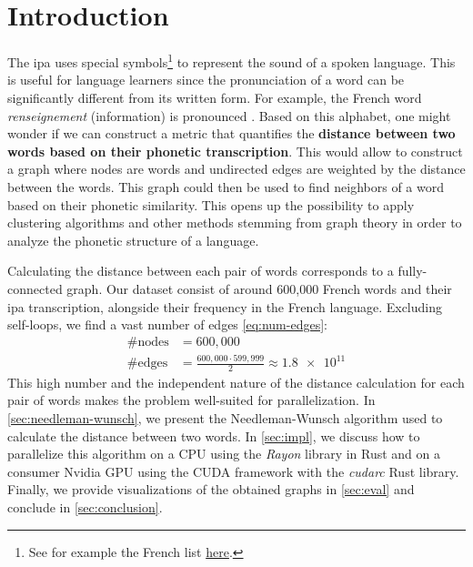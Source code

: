 \section{Introduction}

The \gls{ipa} uses special symbols\footnote{See for example the French list \href{https://en.wikipedia.org/wiki/Help:IPA/French}{here}.} to represent the sound of a spoken language. This is useful for language learners since the pronunciation of a word can be significantly different from its written form. For example, the French word \textit{renseignement} (information) is pronounced . Based on this alphabet, one might wonder if we can construct a metric that quantifies the \textbf{distance between two words based on their phonetic transcription}. This would allow to construct a graph where nodes are words and undirected edges are weighted by the distance between the words. This graph could then be used to find neighbors of a word based on their phonetic similarity. This opens up the possibility to apply clustering algorithms and other methods stemming from graph theory in order to analyze the phonetic structure of a language.

Calculating the distance between each pair of words corresponds to a fully-connected graph. Our dataset consist of around 600,000 French words and their \gls{ipa} transcription, alongside their frequency in the French language. Excluding self-loops, we find a vast number of edges \eqref{eq:num-edges}:
\begin{align}
    \text{\#nodes} &= 600,000 \\
    \text{\#edges} &= \frac{600,000 \cdot 599,999}{2} \approx \num{1.8e11}
\end{align}
This high number and the independent nature of the distance calculation for each pair of words makes the problem well-suited for parallelization. In \autoref{sec:needleman-wunsch}, we present the Needleman-Wunsch algorithm used to calculate the distance between two words. In \autoref{sec:impl}, we discuss how to parallelize this algorithm on a CPU using the \textit{Rayon} library in Rust and on a consumer Nvidia GPU using the CUDA framework with the \textit{cudarc} Rust library. Finally, we provide visualizations of the obtained graphs in \ref{sec:eval} and conclude in \autoref{sec:conclusion}.



